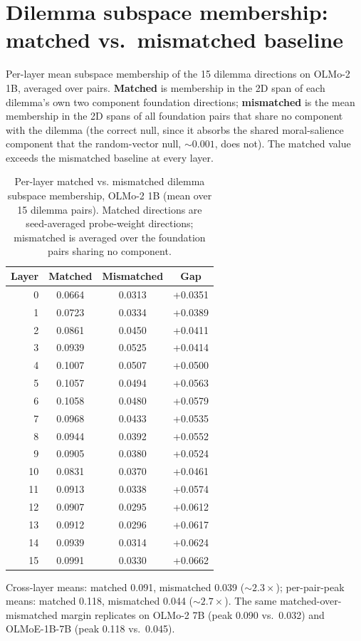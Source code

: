 \section{Dilemma subspace membership: matched vs.~mismatched baseline}\label{dilemma-subspace-membership-matched-vs.-mismatched-baseline}

\label{app:dilemma_membership}

Per-layer mean subspace membership of the 15 dilemma directions on
OLMo-2 1B, averaged over pairs. \textbf{Matched} is membership in the 2D
span of each dilemma's own two component foundation directions;
\textbf{mismatched} is the mean membership in the 2D spans of all foundation
pairs that share no component with the dilemma (the correct null, since
it absorbs the shared moral-salience component that the random-vector
null, \({\sim}0.001\), does not). The matched value exceeds the mismatched
baseline at every layer.

\begin{table}[h]
\centering
\caption{Per-layer matched vs. mismatched dilemma subspace membership, OLMo-2 1B (mean over 15 dilemma pairs). Matched directions are seed-averaged probe-weight directions; mismatched is averaged over the foundation pairs sharing no component.}
\label{tab:dilemma_membership}
\small
\begin{tabular}{r ccc}
\toprule
Layer & Matched & Mismatched & Gap \\
\midrule
0 & 0.0664 & 0.0313 & +0.0351 \\
1 & 0.0723 & 0.0334 & +0.0389 \\
2 & 0.0861 & 0.0450 & +0.0411 \\
3 & 0.0939 & 0.0525 & +0.0414 \\
4 & 0.1007 & 0.0507 & +0.0500 \\
5 & 0.1057 & 0.0494 & +0.0563 \\
6 & 0.1058 & 0.0480 & +0.0579 \\
7 & 0.0968 & 0.0433 & +0.0535 \\
8 & 0.0944 & 0.0392 & +0.0552 \\
9 & 0.0905 & 0.0380 & +0.0524 \\
10 & 0.0831 & 0.0370 & +0.0461 \\
11 & 0.0913 & 0.0338 & +0.0574 \\
12 & 0.0907 & 0.0295 & +0.0612 \\
13 & 0.0912 & 0.0296 & +0.0617 \\
14 & 0.0939 & 0.0314 & +0.0624 \\
15 & 0.0991 & 0.0330 & +0.0662 \\
\bottomrule
\end{tabular}
\end{table}

Cross-layer means: matched 0.091, mismatched 0.039 (\({\sim}2.3\times\));
per-pair-peak means: matched 0.118, mismatched 0.044 (\({\sim}2.7\times\)).
The same matched-over-mismatched margin replicates on OLMo-2 7B
(peak 0.090 vs.~0.032) and OLMoE-1B-7B (peak 0.118 vs.~0.045).
